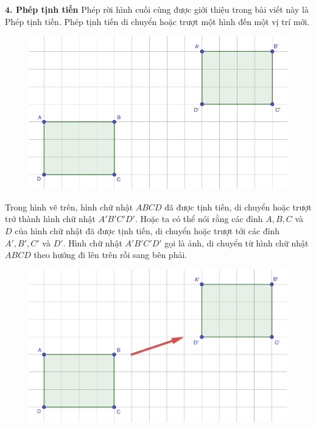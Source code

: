\begin{multicols}{2}
\begin{figure}[H]
	\end{figure}
	\textbf{\color{toancuabi}$\pmb4$. Phép tịnh tiến}
	\vskip 0.1cm
	Phép rời hình cuối cùng được giới thiệu trong bài viết này là Phép tịnh tiến. Phép tịnh tiến di chuyển hoặc trượt một hình đến một vị trí mới.
	\begin{figure}[H]
		\vspace*{-5pt}
		\centering
		\captionsetup{labelformat= empty, justification=centering}
		\includegraphics[width= 1\linewidth]{Picture29}
		\vspace*{-10pt}
	\end{figure}
	Trong hình vẽ trên, hình chữ nhật $ABCD$ đã được tịnh tiến, di chuyển hoặc trượt trở thành hình chữ nhật $A'B'C'D'$. Hoặc ta có thể nói rằng các đỉnh $A,B,C$ và $D$ của hình chữ nhật đã được tịnh tiến, di chuyển hoặc trượt tới các đỉnh $A',B',C'$ và $D'$.
	\vskip 0.1cm  
	Hình chữ nhật $A'B'C'D'$ gọi là ảnh, di chuyển từ hình chữ nhật $ABCD$ theo hướng đi lên trên rồi sang bên phải. 
	\begin{figure}[H]
		\vspace*{-5pt}
		\centering
		\captionsetup{labelformat= empty, justification=centering}
		\includegraphics[width= 1\linewidth]{Picture30}

\end{figure}
\end{multicols}
